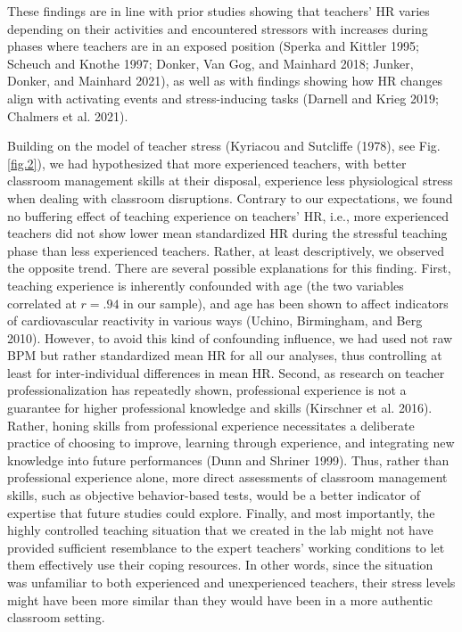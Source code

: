 \documentclass[preprint,
3p]{elsarticle} %
\begin{document}
These findings are in line with prior studies showing that teachers' HR
varies depending on their activities and encountered stressors with
increases during phases where teachers are in an exposed position
(Sperka and Kittler 1995; Scheuch and Knothe 1997; Donker, Van Gog, and
Mainhard 2018; Junker, Donker, and Mainhard 2021), as well as with
findings showing how HR changes align with activating events and
stress-inducing tasks (Darnell and Krieg 2019; Chalmers et al. 2021).

Building on the model of teacher stress (Kyriacou and Sutcliffe (1978),
see Fig.\ref{fig.2}), we had hypothesized that more experienced
teachers, with better classroom management skills at their disposal,
experience less physiological stress when dealing with classroom
disruptions. Contrary to our expectations, we found no buffering effect
of teaching experience on teachers' HR, i.e., more experienced teachers
did not show lower mean standardized HR during the stressful teaching
phase than less experienced teachers. Rather, at least descriptively, we
observed the opposite trend. There are several possible explanations for
this finding. First, teaching experience is inherently confounded with
age (the two variables correlated at \(r = .94\) in our sample), and age
has been shown to affect indicators of cardiovascular reactivity in
various ways (Uchino, Birmingham, and Berg 2010). However, to avoid this
kind of confounding influence, we had used not raw BPM but rather
standardized mean HR for all our analyses, thus controlling at least for
inter-individual differences in mean HR. Second, as research on teacher
professionalization has repeatedly shown, professional experience is not
a guarantee for higher professional knowledge and skills (Kirschner et
al. 2016). Rather, honing skills from professional experience
necessitates a deliberate practice of choosing to improve, learning
through experience, and integrating new knowledge into future
performances (Dunn and Shriner 1999). Thus, rather than professional
experience alone, more direct assessments of classroom management
skills, such as objective behavior-based tests, would be a better
indicator of expertise that future studies could explore. Finally, and
most importantly, the highly controlled teaching situation that we
created in the lab might not have provided sufficient resemblance to the
expert teachers' working conditions to let them effectively use their
coping resources. In other words, since the situation was unfamiliar to
both experienced and unexperienced teachers, their stress levels might
have been more similar than they would have been in a more authentic
classroom setting.
\end{document}

